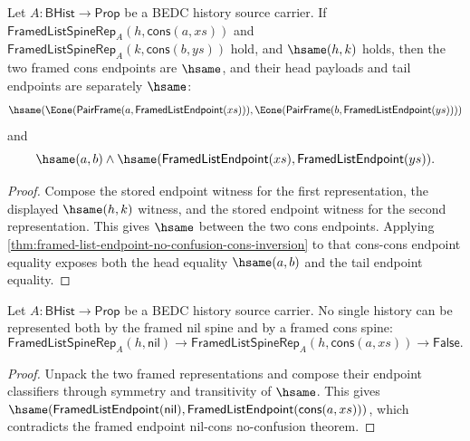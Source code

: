 \begin{theorem}
\label{thm:list-spine-rep-cons-endpoint-injective}
Let $A:\mathsf{BHist}\to\mathsf{Prop}$ be a BEDC history source carrier. If
$\mathsf{FramedListSpineRep}_A(h,\mathsf{cons}(a,xs))$ and
$\mathsf{FramedListSpineRep}_A(k,\mathsf{cons}(b,ys))$ hold, and
$\hsame(h,k)$ holds, then the two framed cons endpoints are $\hsame$, and their
head payloads and tail endpoints are separately $\hsame$:
$$
\hsame(\Eone(\mathsf{PairFrame}(a,\mathsf{FramedListEndpoint}(xs))),
\Eone(\mathsf{PairFrame}(b,\mathsf{FramedListEndpoint}(ys))))
$$
and
$$
\hsame(a,b)\land
\hsame(\mathsf{FramedListEndpoint}(xs),\mathsf{FramedListEndpoint}(ys)).
$$
\end{theorem}
\begin{proof}
Compose the stored endpoint witness for the first representation, the displayed
$\hsame(h,k)$ witness, and the stored endpoint witness for the second
representation. This gives $\hsame$ between the two cons endpoints. Applying
\autoref{thm:framed-list-endpoint-no-confusion-cons-inversion} to that cons-cons
endpoint equality exposes both the head equality $\hsame(a,b)$ and the tail
endpoint equality.
\end{proof}

\begin{theorem}
\label{thm:framed-list-spine-rep-nil-cons-no-confusion}
Let $A:\mathsf{BHist}\to\mathsf{Prop}$ be a BEDC history source carrier. No
single history can be represented both by the framed nil spine and by a framed
cons spine:
$$
\mathsf{FramedListSpineRep}_A(h,\mathsf{nil})\to
\mathsf{FramedListSpineRep}_A(h,\mathsf{cons}(a,xs))\to
\mathsf{False}.
$$
\end{theorem}
\begin{proof}
Unpack the two framed representations and compose their endpoint classifiers
through symmetry and transitivity of $\hsame$. This gives
$\hsame(\mathsf{FramedListEndpoint}(\mathsf{nil}),
\mathsf{FramedListEndpoint}(\mathsf{cons}(a,xs)))$, which contradicts the
framed endpoint nil-cons no-confusion theorem.
\end{proof}
